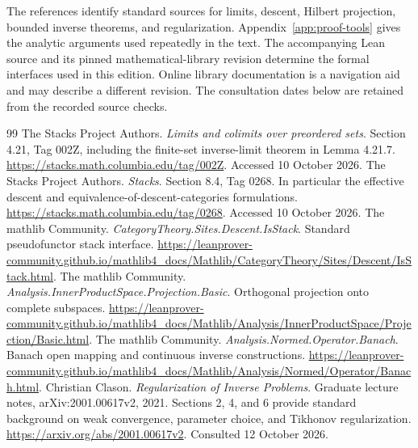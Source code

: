\clearpage
{}\label{app:references}
The references identify standard sources for limits, descent, Hilbert projection, bounded inverse theorems, and regularization. Appendix~\ref{app:proof-tools} gives the analytic arguments used repeatedly in the text. The accompanying Lean source and its pinned mathematical-library revision determine the formal interfaces used in this edition. Online library documentation is a navigation aid and may describe a different revision. The consultation dates below are retained from the recorded source checks.

\begin{thebibliography}{99}
 The Stacks Project Authors. \emph{Limits and colimits over preordered sets}. Section 4.21, Tag 002Z, including the finite-set inverse-limit theorem in Lemma 4.21.7. \url{https://stacks.math.columbia.edu/tag/002Z}. Accessed 10 October 2026.
 The Stacks Project Authors. \emph{Stacks}. Section 8.4, Tag 0268. In particular the effective descent and equivalence-of-descent-categories formulations. \url{https://stacks.math.columbia.edu/tag/0268}. Accessed 10 October 2026.
 The mathlib Community. \emph{CategoryTheory.Sites.Descent.IsStack}. Standard pseudofunctor stack interface. \url{https://leanprover-community.github.io/mathlib4_docs/Mathlib/CategoryTheory/Sites/Descent/IsStack.html}.
 The mathlib Community. \emph{Analysis.InnerProductSpace.Projection.Basic}. Orthogonal projection onto complete subspaces. \url{https://leanprover-community.github.io/mathlib4_docs/Mathlib/Analysis/InnerProductSpace/Projection/Basic.html}.
 The mathlib Community. \emph{Analysis.Normed.Operator.Banach}. Banach open mapping and continuous inverse constructions. \url{https://leanprover-community.github.io/mathlib4_docs/Mathlib/Analysis/Normed/Operator/Banach.html}.
 Christian Clason. \emph{Regularization of Inverse Problems}. Graduate lecture notes, arXiv:2001.00617v2, 2021. Sections 2, 4, and 6 provide standard background on weak convergence, parameter choice, and Tikhonov regularization. \url{https://arxiv.org/abs/2001.00617v2}. Consulted 12 October 2026.
\end{thebibliography}

